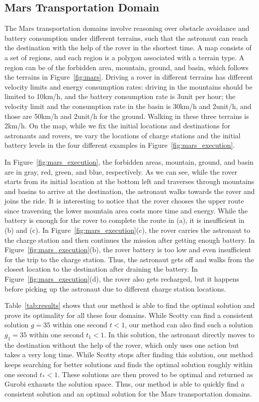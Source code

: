 \documentclass[sigconf]{acmart}
\begin{document}
\subsection{Mars Transportation Domain}
The Mars transportation domains involve reasoning over obstacle avoidance and battery consumption under different terrains, such that the astronaut can reach the destination with the help of the rover in the shortest time. A map consists of a set of regions, and each region is a polygon associated with a terrain type. A region can be of the forbidden area, mountain, ground, and basin, which follows the terrains in Figure~\ref{fig:mars}. Driving a rover in different terrains has different velocity limits and energy consumption rates: driving in the mountains should be limited to 10km/h, and the battery consumption rate is 3unit per hour; the velocity limit and the consumption rate in the basin is 30km/h and 2unit/h, and those are 50km/h and 2unit/h for the ground. Walking in these three terrains is 2km/h. On the map, while we fix the initial locations and destinations for astronauts and rovers, we vary the locations of charge stations and the initial battery levels in the four different examples in Figure~\ref{fig:mars_execution}.


In Figure~\ref{fig:mars_execution}, the forbidden areas, mountain, ground, and basin are in gray, red, green, and blue, respectively. As we can see, while the rover starts from its initial location at the bottom left and traverses through mountains and basins to arrive at the destination, the astronaut walks towards the rover and joins the ride. It is interesting to notice that the rover chooses the upper route since traversing the lower mountain area costs more time and energy. While the battery is enough for the rover to complete the route in (a), it is insufficient in (b) and (c). In Figure~\ref{fig:mars_execution}(c), the rover carries the astronaut to the charge station and then continues the mission after getting enough battery. In  Figure~\ref{fig:mars_execution}(b), the rover battery is too low and even insufficient for the trip to the charge station. Thus, the astronaut gets off and walks from the closest location to the destination after draining the battery. In Figure~\ref{fig:mars_execution}(d), the rover also gets recharged, but it happens before picking up the astronaut due to different charge station locations.


Table~\ref{tab:results} shows that our method is able to find the optimal solution and prove its optimality for all these four domains. While Scotty can find a consistent solution $g = 35$ within one second $t<1$, our method can also find such a solution $g_1 = 35$ within one second $t_1<1$. In this solution, the astronaut directly moves to the destination without the help of the rover, which only uses one action but takes a very long time. While Scotty stops after finding this solution, our method keeps searching for better solutions and finds the optimal solution roughly within one second $t_* < 1$. These solutions are then proved to be optimal and returned as Gurobi exhausts the solution space. Thus, our method is able to quickly find a consistent solution and an optimal solution for the Mars transportation domains.
\end{document}
